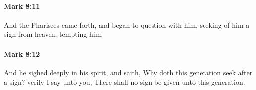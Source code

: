 		\paragraph{Mark 8:11} %
			\label{MARK-8-11}

			And the Pharisees came forth, and began to question with him, seeking of him a sign from heaven, tempting him.

			\begin{framed}
			\scriptsize
				\begin{compactdesc}
					\item[SBLG] 
				\end{compactdesc}
			\end{framed}

		\paragraph{Mark 8:12} %
			\label{MARK-8-12}

			And he sighed deeply in his spirit, and saith, Why doth this generation seek after a sign? verily I say unto you, There shall no sign be given unto this generation.

